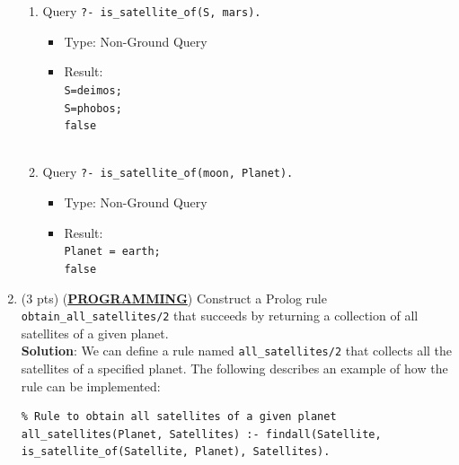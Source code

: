 \documentclass[12pt]{article}
\begin{document}
\begin{spacing}{1.5}
\begin{enumerate}
\begin{enumerate}
		      	\item 
		      	      Query \texttt{?- is\_satellite\_of(S, mars).}
		      	      \begin{itemize}
		      	      	\item Type: Non-Ground Query
		      	      	\item Result: \texttt{\\
		      	      		S=deimos;\\
		      	      		S=phobos;\\
		      	      	false\\}\\
		      	      \end{itemize}

                \item
                    Query \texttt{?- is\_satellite\_of(moon, Planet).}
                    \begin{itemize}
                        \item Type: Non-Ground Query
                        \item Result: \texttt{\\
                            Planet = earth;\\
                            false\\}
                    \end{itemize}
		      	              
		      \end{enumerate}
		      		      		      		      		      		      		      		      
		\item
		      (3 pts) (\uline{\textbf{PROGRAMMING}}) Construct a Prolog rule \texttt{obtain\_all\_satellites/2}
		      that succeeds by returning a collection of all satellites of a given planet.\\
		      		      		      		      		      		      		      		      
		      \textbf{Solution}: We can define a rule named \texttt{all\_satellites/2} that collects all the satellites of a specified planet. The following describes an example of how the rule can be implemented:\\
		      		      		      		      		      		      		      		      
		      \begin{lstlisting}
% Rule to obtain all satellites of a given planet
all_satellites(Planet, Satellites) :- findall(Satellite, is_satellite_of(Satellite, Planet), Satellites).
		      \end{lstlisting}
		      		      		      		      		      		      		      		      

\end{enumerate}
\end{spacing}
\end{document}
